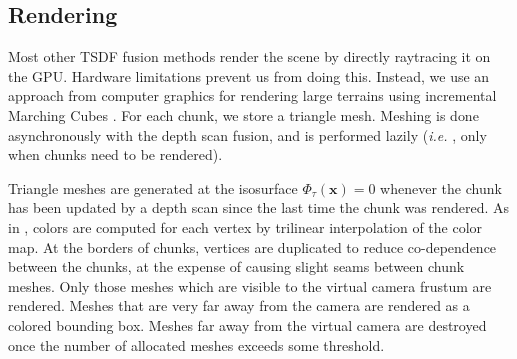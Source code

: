 \documentclass[conference]{IEEEtran}
\newcommand{\ie}{\textit{i.e. }}
\begin{document}
\subsection{Rendering}
\label{section:render}
Most other TSDF fusion methods \cite{Newcombe, NiessnerHashing} render the
scene by directly raytracing it on the GPU. Hardware limitations prevent us from doing
this. Instead, we use an approach from computer graphics for rendering large
terrains \cite{GPUGEMS3} using incremental Marching Cubes \cite{Lorensen1987}.
For each chunk, we store a triangle mesh. Meshing is done asynchronously with
the depth scan fusion, and is performed lazily (\ie, only when chunks need to
be rendered).

Triangle meshes are generated at the isosurface
$\Phi_{\tau}(\mathbf{x}) = 0$ whenever the chunk has been updated by a depth
scan since the last time the chunk was rendered. As in \cite{Bylow2013,
Whelan2013},  colors are computed for each vertex by trilinear interpolation of
the color map. At the borders of chunks, vertices are duplicated to reduce
co-dependence between the chunks, at the expense of causing slight seams
between chunk meshes. Only those meshes which are visible to the virtual camera
frustum are rendered. Meshes that are very far away from the camera are
rendered as a colored bounding box. Meshes far away from the virtual camera are
destroyed once the number of allocated meshes exceeds some threshold.
\end{document}
